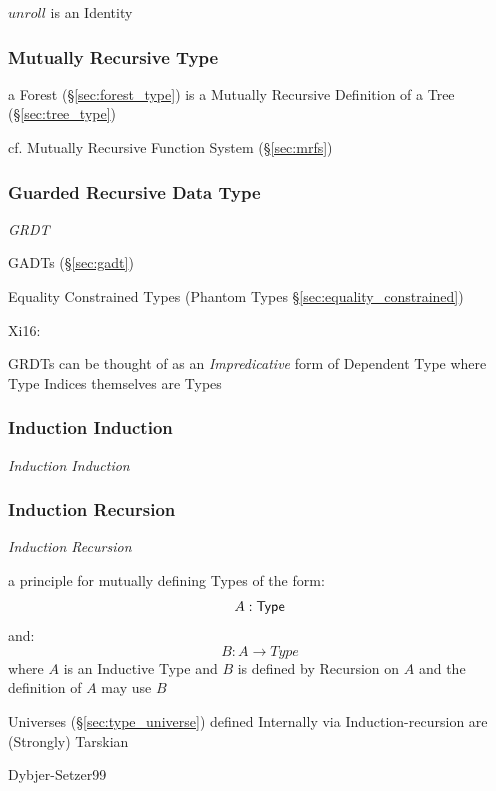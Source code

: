 $unroll$ is an Identity



\subsubsection{Mutually Recursive Type}
\label{sec:mutually_recursive}\hfill

a Forest (\S\ref{sec:forest_type}) is a Mutually Recursive Definition of a Tree
(\S\ref{sec:tree_type})

\fist cf. Mutually Recursive Function System (\S\ref{sec:mrfs})



\subsubsection{Guarded Recursive Data Type}\label{sec:grdt}

\emph{GRDT}

\fist GADTs (\S\ref{sec:gadt})

\fist Equality Constrained Types (Phantom Types
\S\ref{sec:equality_constrained})

Xi16:

GRDTs can be thought of as an \emph{Impredicative} form of Dependent Type where
Type Indices themselves are Types



\subsubsection{Induction Induction}\label{sec:induction_induction}

\emph{Induction Induction}



\subsubsection{Induction Recursion}\label{sec:induction_recursion}

\emph{Induction Recursion}

a principle for mutually defining Types of the form:
\[
  A : \mathsf{Type}
\]
and:
\[
  B : A \rightarrow Type
\]
where $A$ is an Inductive Type and $B$ is defined by Recursion on $A$
and the definition of $A$ may use $B$

Universes (\S\ref{sec:type_universe}) defined Internally via
Induction-recursion are (Strongly) Tarskian

Dybjer-Setzer99



